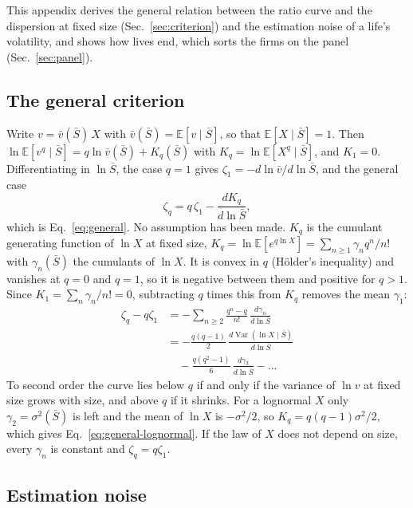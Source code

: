\documentclass[pre,twocolumn,superscriptaddress,nofootinbib]{revtex4-2}
\newcommand{\E}{\mathbb E}
\newcommand{\Var}{\operatorname{Var}}
\newcommand{\Sb}{\bar S}
\begin{document}
This appendix derives the general relation between the ratio curve and the dispersion at fixed size
(Sec.~\ref{sec:criterion}) and the estimation noise of a life's volatility, and shows how lives end, which sorts
the firms on the panel (Sec.~\ref{sec:panel}).

\subsection{The general criterion}
\label{app:cumulant}

Write $v=\bar v(\Sb)\,X$ with $\bar v(\Sb)=\E[v\mid\Sb]$, so that $\E[X\mid\Sb]=1$.  Then
$\ln\E[v^q\mid\Sb]=q\ln\bar v(\Sb)+K_q(\Sb)$ with $K_q=\ln\E[X^q\mid\Sb]$, and $K_1=0$.  Differentiating in $\ln\Sb$, the
case $q=1$ gives $\zeta_1=-d\ln\bar v/d\ln\Sb$, and the general case
\begin{equation}
\zeta_q=q\,\zeta_1-\frac{dK_q}{d\ln\Sb},
\end{equation}
which is Eq.~\eqref{eq:general}.  No assumption has been made.  $K_q$ is the cumulant generating function of $\ln X$
at fixed size, $K_q=\ln\E[e^{q\ln X}]=\sum_{n\ge1}\gamma_nq^n/n!$ with $\gamma_n(\Sb)$ the cumulants of $\ln X$.  It is convex in
$q$ (H\"older's inequality) and vanishes at $q=0$ and $q=1$, so it is negative between them and positive for
$q>1$.  Since $K_1=\sum_n\gamma_n/n!=0$, subtracting $q$ times this from $K_q$ removes the mean $\gamma_1$:
\begin{equation}
\begin{split}
\zeta_q-q\zeta_1&=-\sum_{n\ge2}\frac{q^n-q}{n!}\,\frac{d\gamma_n}{d\ln\Sb}\\
&=-\frac{q(q-1)}2\,\frac{d\Var(\ln X\mid\Sb)}{d\ln\Sb}\\
&\quad-\frac{q(q^2-1)}{6}\,\frac{d\gamma_3}{d\ln\Sb}-\dots
\end{split}
\end{equation}
To second order the curve lies below $q$ if and only if the variance of $\ln v$ at fixed size grows with size, and
above $q$ if it shrinks.  For a lognormal $X$ only $\gamma_2=\sigma^2(\Sb)$ is left and the mean of $\ln X$ is $-\sigma^2/2$, so
$K_q=q(q-1)\sigma^2/2$, which gives Eq.~\eqref{eq:general-lognormal}.  If the law of $X$ does not depend on size,
every $\gamma_n$ is constant and $\zeta_q=q\zeta_1$.

\subsection{Estimation noise}
\end{document}
